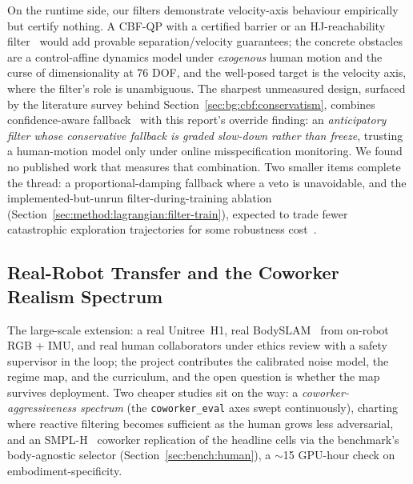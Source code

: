\documentclass[11pt,a4paper]{report}
\newcommand{\bodyslampp}{BodySLAM\nolinebreak[4]\hspace{-.05em}\raisebox{.2ex}{\scriptsize ++}}
\begin{document}
On the runtime side, our filters demonstrate velocity-axis behaviour
empirically but certify nothing. A CBF-QP with a certified barrier
or an HJ-reachability
filter~\cite{bansal2017hamilton,hsu2024safetyfilter} would add
provable separation/velocity guarantees; the concrete obstacles are
a control-affine dynamics model under \emph{exogenous} human motion
and the curse of dimensionality at 76 DOF, and the well-posed target
is the velocity axis, where the filter's role is unambiguous. The
sharpest unmeasured design, surfaced by the literature survey behind
Section~\ref{sec:bg:cbf:conservatism}, combines confidence-aware
fallback~\cite{tian2022confidence} with this report's override
finding: an \emph{anticipatory filter whose conservative fallback is
graded slow-down rather than freeze}, trusting a human-motion model
only under online misspecification monitoring. We found no published
work that measures that combination. Two smaller items complete the
thread: a proportional-damping fallback where a veto is unavoidable,
and the implemented-but-unrun filter-during-training ablation
(Section~\ref{sec:method:lagrangian:filter-train}), expected to
trade fewer catastrophic exploration trajectories for some
robustness cost~\cite{cbfrl2024,shield2025}.

\subsection{Real-Robot Transfer and the Coworker Realism Spectrum}
\label{sec:fw:realbody}
\label{sec:fw:embodiment}

The large-scale extension: a real Unitree~H1, real
\bodyslampp{}~\cite{henning2023bodyslampp} from on-robot RGB + IMU,
and real human collaborators under ethics review with a safety
supervisor in the loop; the project contributes the calibrated noise
model, the regime map, and the curriculum, and the open question is
whether the map survives deployment. Two cheaper studies sit on the
way: a \emph{coworker-aggressiveness spectrum} (the
\texttt{coworker\_eval} axes swept continuously), charting where
reactive filtering becomes sufficient as the human grows less
adversarial, and an SMPL-H~\cite{romero2017smplh} coworker
replication of the headline cells via the benchmark's body-agnostic
selector (Section~\ref{sec:bench:human}), a $\sim$15 GPU-hour check
on embodiment-specificity.


\clearpage
\end{document}
